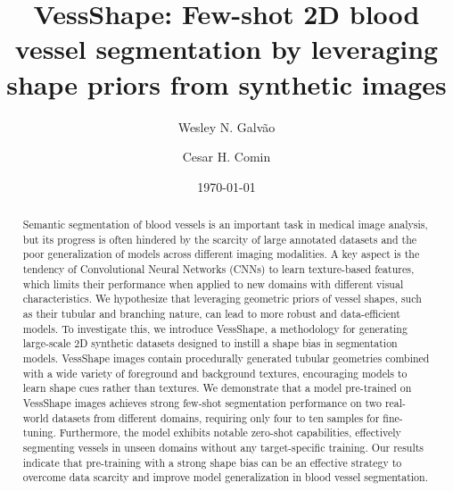 \documentclass[%
reprint,
nofootinbib,
 amsmath,amssymb,
aps,
superscriptaddress,
showkeys,
longbibliography
]{revtex4-1}
\begin{document}
%



\title{VessShape: Few-shot 2D blood vessel segmentation by leveraging shape priors from synthetic images}

\author{Wesley N. Galvão}


\author{Cesar H. Comin}

\date{\today}%

\begin{abstract}

Semantic segmentation of blood vessels is an important task in medical image analysis, but its progress is often hindered by the scarcity of large annotated datasets and the poor generalization of models across different imaging modalities. A key aspect is the tendency of Convolutional Neural Networks (CNNs) to learn texture-based features, which limits their performance when applied to new domains with different visual characteristics. We hypothesize that leveraging geometric priors of vessel shapes, such as their tubular and branching nature, can lead to more robust and data-efficient models. To investigate this, we introduce VessShape, a methodology for generating large-scale 2D synthetic datasets designed to instill a shape bias in segmentation models. VessShape images contain procedurally generated tubular geometries combined with a wide variety of foreground and background textures, encouraging models to learn shape cues rather than textures. We demonstrate that a model pre-trained on VessShape images achieves strong few-shot segmentation performance on two real-world datasets from different domains, requiring only four to ten samples for fine-tuning. Furthermore, the model exhibits notable zero-shot capabilities, effectively segmenting vessels in unseen domains without any target-specific training. Our results indicate that pre-training with a strong shape bias can be an effective strategy to overcome data scarcity and improve model generalization in blood vessel segmentation.

\end{abstract}
\end{document}
